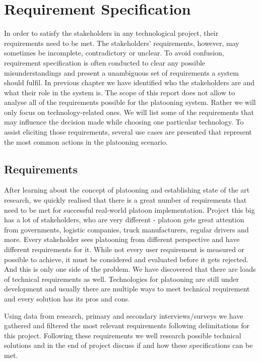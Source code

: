 \section{Requirement Specification}\label{sec:requirements}
%
In order to satisfy the stakeholders in any technological project, their requirements need to be met. The stakeholders' requirements, however, may sometimes be incomplete, contradictory or unclear. To avoid confusion, requirement specification is often conducted to clear any possible misunderstandings and present a unambiguous set of requirements a system should fulfil. In previous chapter we have identified who the stakeholders are and what their role in the system is. The scope of this report does not allow to analyse all of the requirements possible for the platooning system. Rather we will only focus on technology-related ones. We will list some of the requirements that may influence the decision made while choosing one particular technology. To assist eliciting those requirements, several use cases are presented that represent the most common actions in the platooning scenario.
%

%
\subsection{Requirements}
After learning about the concept of platooning and establishing state of the art research, we quickly realised that there is a great number of requirements that need to be met for successful real-world platoon implementation. Project this big has a lot of stakeholders, who are very different - platoon gets great attention from governments, logistic companies, truck manufacturers, regular drivers and more. Every stakeholder sees platooning from different perspective and have different requirements for it. While not every user requirement is measured or possible to achieve, it must be considered and evaluated before it gets rejected. And this is only one side of the problem. We have discovered that there are loads of technical requirements as well. Technologies for platooning are still under development and usually there are multiple ways to meet technical requirement and every solution has its pros and cons.\par
Using data from research, primary and secondary interviews/surveys we have gathered and filtered the most relevant requirements following delimitations for this project. Following these requirements we well research possible technical solutions and in the end of project discuss if and how these specifications can be met.\par
%
